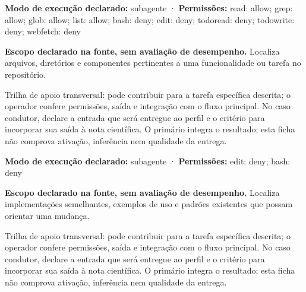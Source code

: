 \begin{arquitetura}
\textbf{Modo de execução declarado:} subagente · \textbf{Permissões:} read: allow; grep: allow; glob: allow; list: allow; bash: deny; edit: deny; todoread: deny; todowrite: deny; webfetch: deny
\end{arquitetura}


\begin{descricao}
\textbf{Escopo declarado na fonte, sem avaliação de desempenho.}
Localiza arquivos, diretórios e componentes pertinentes a uma funcionalidade ou tarefa no repositório.
\end{descricao}

\begin{funcao}
Trilha de apoio transversal: pode contribuir para a tarefa específica descrita; o operador confere permissões, saída e integração com o fluxo principal. No caso condutor, declare a entrada que será entregue ao perfil e o critério para incorporar sua saída à nota científica. O primário integra o resultado; esta ficha não comprova ativação, inferência nem qualidade da entrega.
\end{funcao}

\begin{arquitetura}
\textbf{Modo de execução declarado:} subagente · \textbf{Permissões:} edit: deny; bash: deny
\end{arquitetura}


\begin{descricao}
\textbf{Escopo declarado na fonte, sem avaliação de desempenho.}
Localiza implementações semelhantes, exemplos de uso e padrões existentes que possam orientar uma mudança.
\end{descricao}

\begin{funcao}
Trilha de apoio transversal: pode contribuir para a tarefa específica descrita; o operador confere permissões, saída e integração com o fluxo principal. No caso condutor, declare a entrada que será entregue ao perfil e o critério para incorporar sua saída à nota científica. O primário integra o resultado; esta ficha não comprova ativação, inferência nem qualidade da entrega.
\end{funcao}

